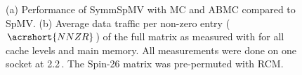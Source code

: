 \begin{figure}[tbp]
  	\centering
    \hspace{1em}
  	
  	\caption{(a) Performance of \acrshort{SymmSpMV} with \acrshort{MC} and \acrshort{ABMC} compared to \acrshort{SpMV}. (b) Average data traffic per non-zero entry ($\acrshort{NNZR}$) of the full matrix as measured with \LIKWID for all cache levels and main memory. All measurements were done on one \IVB socket at 2.2\,\GHZ. The Spin-26 matrix was pre-permuted with \acrshort{RCM}. }
  	\label{fig:motivation}
  \end{figure}
 
